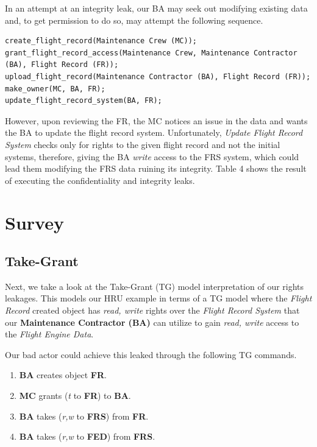 \documentclass[10pt,journal,compsoc]{IEEEtran}
\begin{document}
  In an attempt at an integrity leak, our BA may seek out modifying existing data and, to get permission to do so, may attempt the following sequence. 

\begin{lstlisting}
create_flight_record(Maintenance Crew (MC));
grant_flight_record_access(Maintenance Crew, Maintenance Contractor (BA), Flight Record (FR));
upload_flight_record(Maintenance Contractor (BA), Flight Record (FR));
make_owner(MC, BA, FR);
update_flight_record_system(BA, FR);
\end{lstlisting}  

  However, upon reviewing the FR, the MC notices an issue in the data and wants the BA to update the flight record system. 
  Unfortunately, \textit{Update Flight Record System} checks only for rights to the given flight record and not the initial systems, therefore, giving the BA \textit{write} access to the FRS system, which could lead them modifying the FRS data ruining its integrity.
  Table 4 shows the result of executing the confidentiality and integrity leaks. 

\section{Survey}

\subsection{Take-Grant}

  Next, we take a look at the Take-Grant (TG) model interpretation of our rights leakages. 
  This models our HRU example in terms of a TG model where the \textit{Flight Record} created object has \textit{read, write} rights over the \textit{Flight Record System} that our \textbf{Maintenance Contractor (BA)} can utilize to gain \textit{read, write} access to the \textit{Flight Engine Data}.

  Our bad actor could achieve this leaked through the following TG commands. 

  \begin{enumerate}
    \item \textbf{BA} creates object \textbf{FR}.
    \item \textbf{MC} grants (\textit{t} to \textbf{FR}) to \textbf{BA}.
    \item \textbf{BA} takes (\textit{r,w} to \textbf{FRS}) from \textbf{FR}.
    \item \textbf{BA} takes (\textit{r,w} to \textbf{FED}) from \textbf{FRS}.
  \end{enumerate}
\end{document}
